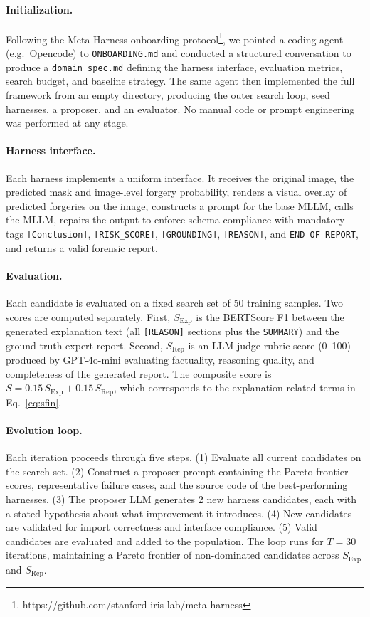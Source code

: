 \documentclass[sigconf, screen, review, anonymous]{acmart}
\begin{document}
\paragraph{Initialization.} Following the Meta-Harness onboarding protocol\footnote{https://github.com/stanford-iris-lab/meta-harness}, we pointed a coding agent (e.g.\ Opencode) to \texttt{ONBOARDING.md} and conducted a structured conversation to produce a \texttt{domain\_spec.md} defining the harness interface, evaluation metrics, search budget, and baseline strategy. The same agent then implemented the full framework from an empty directory, producing the outer search loop, seed harnesses, a proposer, and an evaluator. No manual code or prompt engineering was performed at any stage.

\paragraph{Harness interface.} Each harness implements a uniform interface. It receives the original image, the predicted mask and image-level forgery probability, renders a visual overlay of predicted forgeries on the image, constructs a prompt for the base MLLM, calls the MLLM, repairs the output to enforce schema compliance with mandatory tags
\texttt{[Conclusion]}, \texttt{[RISK\_SCORE]}, \texttt{[GROUNDING]},
\texttt{[REASON]}, and \texttt{END OF REPORT}, and returns a valid
forensic report.

\paragraph{Evaluation.} Each candidate is evaluated on a fixed search set of 50 training samples. Two scores are computed separately. First, $S_{\text{Exp}}$ is the BERTScore F1 between the generated explanation text (all \texttt{[REASON]} sections plus the \texttt{SUMMARY}) and the ground-truth expert report. Second, $S_{\text{Rep}}$ is an LLM-judge rubric score (0--100) produced by GPT-4o-mini evaluating factuality, reasoning quality, and completeness of the generated report. The composite score is $S = 0.15\,S_{\text{Exp}} + 0.15\,S_{\text{Rep}}$, which corresponds to the explanation-related terms in Eq.~\eqref{eq:sfin}.

\paragraph{Evolution loop.} Each iteration proceeds through five steps. (1) Evaluate all current candidates on the search set. (2) Construct a proposer prompt containing the Pareto-frontier scores, representative failure cases, and the source code of the best-performing harnesses. (3) The proposer LLM generates 2 new harness candidates, each with a stated hypothesis about what improvement it introduces. (4) New candidates are validated for import correctness and interface compliance. (5) Valid candidates are evaluated and added to the population. The loop runs for $T = 30$ iterations, maintaining a Pareto frontier of non-dominated candidates across $S_{\text{Exp}}$ and $S_{\text{Rep}}$.
\end{document}
